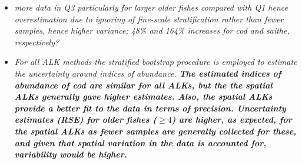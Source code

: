 \documentclass[a4paper 12pt]{article}
\numberwithin{equation}{section}
\begin{document}
\clearpage
\begin{itemize}

\item \emph{more data in Q3 particularly for larger older fishes compared with Q1 hence overestimation due to ignoring of fine-scale stratification rather than fewer samples, hence higher variance; 48\% and 164\% increases for cod and saithe, respectively?}

\item \emph{For all ALK methods the stratified bootstrap procedure is employed to estimate the uncertainty around indices of abundance. {\bf The estimated indices of abundance of cod are similar for all ALKs, but the the spatial ALKs generally gave higher estimates. Also, the spatial ALKs provide a better fit to the data in terms of precision. Uncertainty estimates (RSE) for older fishes ($\ge 4$) are higher, as expected, for the spatial ALKs as fewer samples are generally collected for these, and given that spatial variation in the data is accounted for, variability would be higher.}}


\end{itemize}
\end{document}
